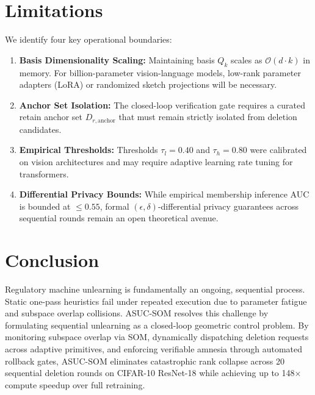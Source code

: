 \documentclass[conference]{IEEEtran}
\begin{document}
\section{Limitations}
We identify four key operational boundaries:
\begin{enumerate}
    \item \textbf{Basis Dimensionality Scaling:} Maintaining basis $Q_k$ scales as $\mathcal{O}(d \cdot k)$ in memory. For billion-parameter vision-language models, low-rank parameter adapters (LoRA) or randomized sketch projections will be necessary.
    \item \textbf{Anchor Set Isolation:} The closed-loop verification gate requires a curated retain anchor set $D_{r,\text{anchor}}$ that must remain strictly isolated from deletion candidates.
    \item \textbf{Empirical Thresholds:} Thresholds $\tau_l=0.40$ and $\tau_h=0.80$ were calibrated on vision architectures and may require adaptive learning rate tuning for transformers.
    \item \textbf{Differential Privacy Bounds:} While empirical membership inference AUC is bounded at $\le 0.55$, formal $(\epsilon, \delta)$-differential privacy guarantees across sequential rounds remain an open theoretical avenue.
\end{enumerate}

\section{Conclusion}
Regulatory machine unlearning is fundamentally an ongoing, sequential process. Static one-pass heuristics fail under repeated execution due to parameter fatigue and subspace overlap collisions. ASUC-SOM resolves this challenge by formulating sequential unlearning as a closed-loop geometric control problem. By monitoring subspace overlap via SOM, dynamically dispatching deletion requests across adaptive primitives, and enforcing verifiable amnesia through automated rollback gates, ASUC-SOM eliminates catastrophic rank collapse across 20 sequential deletion rounds on CIFAR-10 ResNet-18 while achieving up to 148$\times$ compute speedup over full retraining.
\end{document}
